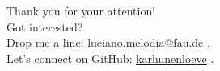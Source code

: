 \documentclass[aspectratio=169]{beamer}
\newcommand\Fontvi{\fontsize{13}{13}\selectfont}
\theoremstyle{plain}
\begin{document}
\begin{frame}[plain]
    \Fontvi
    \centering
    {\LARGE Thank you for your attention!}\\[0.5cm]

    {\Large Got interested?}\\
    Drop me a line: \href{mailto:luciano.melodia@fau.de}{luciano.melodia@fau.de} {\footnotesize \faEnvelope}.\\
    Let's connect on GitHub: \href{https://karhunenloeve.github.io}{karhunenloeve} {\footnotesize \faGithub}.\end{frame}
\end{document}
